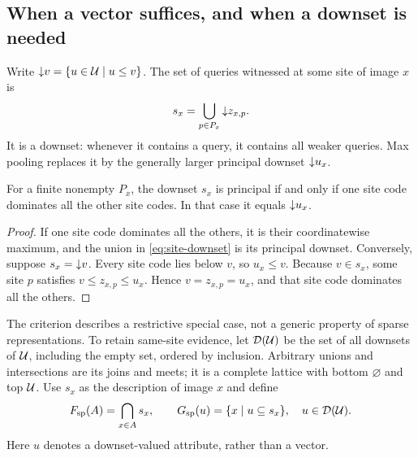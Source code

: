 \subsection{When a vector suffices, and when a downset is needed}
\label{sub:downsets}
Write $\mathord{\downarrow} v=\{u\in\mathcal{U}\mid u\leq v\}$. The set of queries witnessed
at some site of image $x$ is
\begin{equation}\label{eq:site-downset}
  s_{x}=\bigcup_{p\in P_{x}}\mathord{\downarrow} z_{x,p}.
\end{equation}
It is a downset: whenever it contains a query, it contains all weaker
queries. Max pooling replaces it by the generally larger principal
downset $\mathord{\downarrow} u_{x}$.

\begin{proposition}
  \label{prop:principal-criterion}
  For a finite nonempty $P_{x}$, the downset $s_{x}$ is principal if and
  only if one site code dominates all the other site codes. In that case
  it equals $\mathord{\downarrow} u_{x}$.
\end{proposition}
\begin{proof}
  If one site code dominates all the others, it is their coordinatewise
  maximum, and the union in \cref{eq:site-downset} is its principal downset.
  Conversely, suppose $s_{x}=\mathord{\downarrow} v$. Every site code lies below $v$,
  so $u_{x}\leq v$. Because $v\in s_{x}$, some site $p$ satisfies
  $v\leq z_{x,p}\leq u_{x}$. Hence $v=z_{x,p}=u_{x}$, and that site code
  dominates all the others.
\end{proof}

The criterion describes a restrictive special case, not a generic
property of sparse representations. To retain same-site evidence, let
$\mathcal{D}(\mathcal{U})$ be the set of all downsets of $\mathcal{U}$, including the
empty set, ordered by inclusion. Arbitrary unions and intersections are
its joins and meets; it is a complete lattice with bottom $\varnothing$
and top $\mathcal{U}$. Use $s_{x}$ as the description of image $x$ and define
\begin{equation}\label{eq:downset-derivations}
  F_{\mathrm{sp}}(A)=\bigcap_{x\in A}s_{x},\qquad
  G_{\mathrm{sp}}(u)=\{x\mid u\subseteq s_{x}\},
  \quad u\in\mathcal{D}(\mathcal{U}).
\end{equation}
Here $u$ denotes a downset-valued attribute, rather than a vector.

